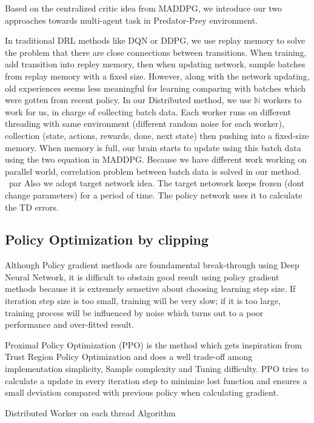 \documentclass[11pt,twocolumn]{jarticle} %
\begin{document}
Based on the centralized critic idea from MADDPG, we introduce our two approaches towards multi-agent task in Predator-Prey environment. \par

In traditional DRL methods like DQN or DDPG, we use replay memory to solve the problem that there are close connections between transitions. When training, add transition into repley memory, then when updating network, sample batches from replay memory with a fixed size. However, along with the network updating, old experiences seems less meaningful for learning comparing with batches which were gotten from recent policy. 
In our Distributed method, we use $\mathbb{N}$ workers to work for us, in charge of collecting batch data. Each worker runs on different threading with same environment (different random noise for each worker), collection (state, actions, rewards, done, next state) then pushing into a fixed-size memory. When memory is full, our brain starts to update using this batch data using the two equation in MADDPG. Because we have different work working on parallel world, correlation problem between batch data is solved in our method. \ par
Also we adopt target network idea. The target netowork keeps frozen (dont change parameters) for a period of time. The policy network uses it to calculate the TD errors.

\subsection{Policy Optimization by clipping}
Although Policy gradient methods are foundamental break-through using Deep Neural Network, it is difficult to obstain good result using policy gradient methods because it is extremely sensetive about choosing learning step size. If iteration step size is too small, training will be very slow; if it is too large, training process will be influenced by noise which turns out to a poor performance and over-fitted result. \par
Proximal Policy Optimization (PPO) \cite{ppo} is the method which gets inspiration from Trust Region Policy Optimization and does a well trade-off among implementation simplicity, Sample complexity and Tuning difficulty. PPO tries to calculate a update in every iteration step to minimize lost function and ensures a small deviation compared with previous policy when calculating gradient.


\begin{algorithm*}
\caption{Distributed Worker on each thread Algorithm}
\begin{algorithmic}
  \EndIf
\EndFor
\end{algorithmic}
\end{algorithm*}
\end{document}

